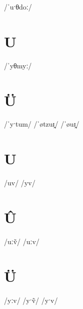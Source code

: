 \documentclass[10pt,a4paper,twoside]{book}
\begin{document}
\begin{multicols}{3}
 {/ˈuˑθdoː/} {}
\end{multicols}

\section*{U}

\begin{multicols}{3}
 {/ˈyθmyː/} {}
\end{multicols}

\section*{Ü}

\begin{multicols}{3}
 {/ˈyˑtum/} {}
 {/ˈøtzuɪ̯/} {}
 {/ˈøuɪ̯/} {}
\end{multicols}

\section*{U}

\begin{multicols}{3}
 {/uv/} {}
 {/yv/} {}
\end{multicols}

\section*{Û}

\begin{multicols}{3}
 {/uːṽ/} {}
 {/uːv/} {}
\end{multicols}

\section*{Ü}

\begin{multicols}{3}
 {/yːv/} {}
 {/yˑṽ/} {}
 {/yˑv/} {}
\end{multicols}
\end{document}
